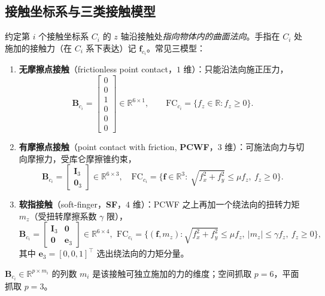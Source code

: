 \subsection{接触坐标系与三类接触模型}
\label{sec:gc-contact-models}

约定第 $i$ 个接触坐标系 $C_i$ 的 $z$ 轴沿接触处\emph{指向物体内的曲面法向}\cite{murray1994mathematical}。手指在 $C_i$ 处施加的接触力（在 $C_i$ 系下表达）记 $\mathbf{f}_{c_i}$。常见三模型：

\begin{definition}
\label{def:gc-contact-models}
\hfill
\begin{enumerate}
  \item \textbf{无摩擦点接触}（frictionless point contact，$1$ 维）：只能沿法向施正压力，
  \begin{equation}
    \mathbf{B}_{c_i}=\begin{bmatrix}0\\0\\1\\0\\0\\0\end{bmatrix}\in\mathbb{R}^{6\times1},
    \qquad \mathrm{FC}_{c_i}=\{f_z\in\mathbb{R}: f_z\ge0\}.
    \label{eq:gc-Bc-frictionless}
  \end{equation}
  \item \textbf{有摩擦点接触}（point contact with friction, \textbf{PCWF}，$3$ 维）：可施法向力与切向摩擦力，受库仑摩擦锥约束，
  \begin{equation}
    \mathbf{B}_{c_i}=\begin{bmatrix}\mathbf{I}_3\\ \mathbf{0}_3\end{bmatrix}\in\mathbb{R}^{6\times3},
    \quad
    \mathrm{FC}_{c_i}=\Big\{\mathbf{f}\in\mathbb{R}^3:\ \sqrt{f_x^2+f_y^2}\le\mu f_z,\ f_z\ge0\Big\}.
    \label{eq:gc-Bc-pcwf}
  \end{equation}
  \item \textbf{软指接触}（soft-finger，\textbf{SF}，$4$ 维）：PCWF 之上再加一个绕法向的扭转力矩 $m_z$（受扭转摩擦系数 $\gamma$ 限），
  \begin{equation}
    \mathbf{B}_{c_i}=\begin{bmatrix}\mathbf{I}_3 & \mathbf{0}\\ \mathbf{0} & \mathbf{e}_3\end{bmatrix}\in\mathbb{R}^{6\times4},
    \ \,
    \mathrm{FC}_{c_i}=\Big\{(\mathbf{f},m_z):\sqrt{f_x^2+f_y^2}\le\mu f_z,\ |m_z|\le\gamma f_z,\ f_z\ge0\Big\},
    \label{eq:gc-Bc-sf}
  \end{equation}
  其中 $\mathbf{e}_3=[0,0,1]^\top$ 选出绕法向的力矩分量。
\end{enumerate}
$\mathbf{B}_{c_i}\in\mathbb{R}^{p\times m_i}$ 的列数 $m_i$ 是该接触可独立施加的力的维度；空间抓取 $p=6$，平面抓取 $p=3$。
\end{definition}

